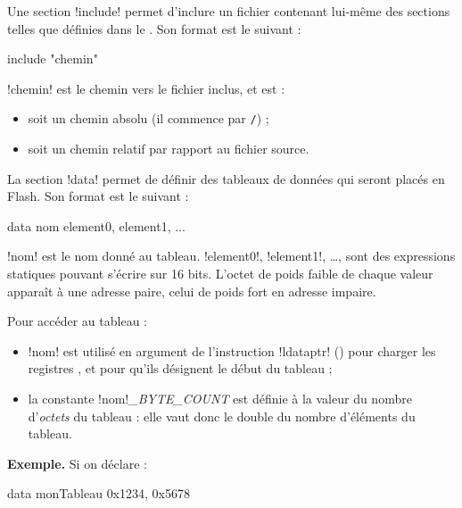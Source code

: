 
Une section \pic!include! permet d'inclure un fichier contenant lui-même des sections telles que définies dans le .  Son format est le suivant :

\begin{piccolo}
  include "chemin"
\end{piccolo}

\pic!chemin! est le chemin vers le fichier inclus, et est :
\begin{itemize}
  \item soit un chemin absolu (il commence par \texttt{/}) ;
  \item soit un chemin relatif par rapport au fichier source.
\end{itemize}









La section \pic!data! permet de définir des tableaux de données qui seront placés en Flash. Son format est le suivant :

\begin{piccolo}
  data nom {element0, element1, ... }
\end{piccolo}

\pic!nom! est le nom donné au tableau. \pic!element0!, \pic!element1!, …, sont des expressions statiques pouvant s'écrire sur 16 bits. L'octet de poids faible de chaque valeur apparaît à une adresse paire, celui de poids fort en adresse impaire.

Pour accéder au tableau :
\begin{itemize}
  \item \pic!nom!  est utilisé en argument de l'instruction \pic!ldataptr! () pour charger les registres ,  et  pour qu'ils désignent le début du tableau ;
  \item la constante \pic!nom!\emph{\small{\_BYTE\_COUNT}} est définie à la valeur du nombre d'\emph{octets} du tableau : elle vaut donc le double du nombre d'éléments du tableau.
\end{itemize}



\textbf{Exemple.} Si on déclare :
\begin{piccolo}
  data monTableau {0x1234, 0x5678}
\end{piccolo}

